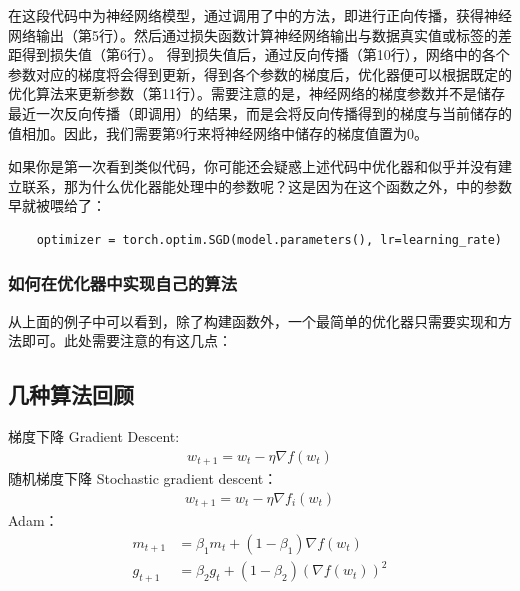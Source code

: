 在这段代码中为神经网络模型，通过调用了中的方法，即进行正向传播，获得神经网络输出（第5行）。然后通过损失函数计算神经网络输出与数据真实值或标签的差距得到损失值（第6行）。
得到损失值后，通过反向传播（第10行），网络中的各个参数对应的梯度将会得到更新，得到各个参数的梯度后，优化器便可以根据既定的优化算法来更新参数（第11行）。需要注意的是，神经网络的梯度参数并不是储存最近一次反向传播（即调用）的结果，而是会将反向传播得到的梯度与当前储存的值相加。因此，我们需要第9行来将神经网络中储存的梯度值置为0。

如果你是第一次看到类似代码，你可能还会疑惑上述代码中优化器和似乎并没有建立联系，那为什么优化器能处理中的参数呢？这是因为在这个函数之外，中的参数早就被喂给了：
\begin{lstlisting}
    optimizer = torch.optim.SGD(model.parameters(), lr=learning_rate)
\end{lstlisting}

\subsubsection{如何在优化器中实现自己的算法}

从上面的例子中可以看到，除了构建函数外，一个最简单的优化器只需要实现和方法即可。此处需要注意的有这几点：


\subsection{几种算法回顾}

梯度下降 Gradient Descent:
\begin{align} 
w_{t+1} = w_t - \eta \nabla f(w_t)
\end{align}
随机梯度下降 Stochastic gradient descent：
\begin{align} 
w_{t+1} = w_t - \eta \nabla f_i(w_t)
\end{align}
Adam：
\begin{align} %
    m_{t+1} & = \beta_1 m_t + (1-\beta_1) \nabla f(w_t)   \\
    g_{t+1} & = \beta_2 g_t + (1-\beta_2) (\nabla f(w_t))^2
\end{align}


